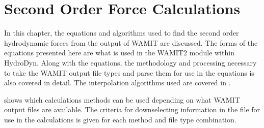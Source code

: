 \chapter{Second Order Force Calculations}
\label{chap:2ndOrdCalc}

In this chapter, the equations and algorithms used to find the second order hydrodynamic forces from the output of WAMIT are discussed.
The forms of the equations presented here are what is used in the WAMIT2 module within HydroDyn.
  Along with the equations, the methodology and processing necessary to take the WAMIT output file types and parse them for use in the equations is also covered in detail.
The interpolation algorithms used are covered in .

 shows which calculations methods can be used depending on what WAMIT output files are available.  The criteria for downselecting information in the file for use in the calculations is given for each method and file type combination.


